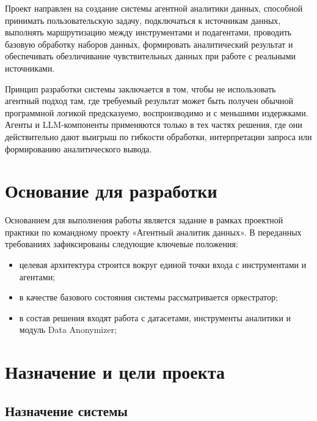 \documentclass[14pt,a4paper]{extarticle}
\begin{document}
Проект направлен на создание системы агентной аналитики данных, способной принимать пользовательскую задачу, подключаться к источникам данных, выполнять маршрутизацию между инструментами и подагентами, проводить базовую обработку наборов данных, формировать аналитический результат и обеспечивать обезличивание чувствительных данных при работе с реальными источниками.

Принцип разработки системы заключается в том, чтобы не использовать агентный подход там, где требуемый результат может быть получен обычной программной логикой предсказуемо, воспроизводимо и с меньшими издержками. Агенты и LLM-компоненты применяются только в тех частях решения, где они действительно дают выигрыш по гибкости обработки, интерпретации запроса или формированию аналитического вывода.

\section{Основание для разработки}

Основанием для выполнения работы является задание в рамках проектной практики по командному проекту «Агентный аналитик данных». В переданных требованиях зафиксированы следующие ключевые положения:
\begin{itemize}
    \item целевая архитектура строится вокруг единой точки входа с инструментами и агентами;
    \item в качестве базового состояния системы рассматривается оркестратор;
    \item в состав решения входят работа с датасетами, инструменты аналитики и модуль Data Anonymizer;
\end{itemize}

\section{Назначение и цели проекта}

\subsection{Назначение системы}
\end{document}
